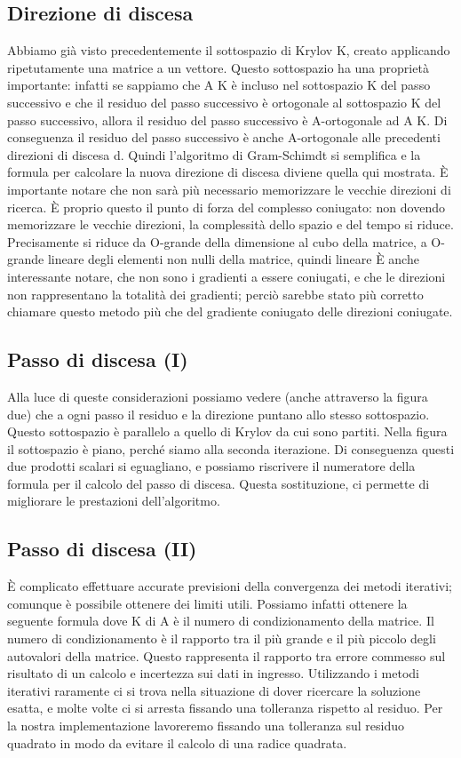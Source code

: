 \documentclass[a4paper]{article}
\begin{document}
\subsection*{Direzione di discesa}
Abbiamo già visto precedentemente il sottospazio di Krylov K, creato applicando ripetutamente una matrice a un vettore.
Questo sottospazio ha una proprietà importante: infatti se sappiamo che A K è incluso nel sottospazio K del passo successivo e che il residuo del passo successivo è ortogonale  al sottospazio K del passo successivo, allora il residuo del passo successivo è A-ortogonale ad A K.
Di conseguenza il residuo del passo successivo è anche A-ortogonale alle precedenti direzioni di discesa d.
Quindi l’algoritmo di Gram-Schimdt si semplifica e la formula per calcolare la nuova direzione di discesa diviene quella qui mostrata.
È importante notare che non sarà più necessario memorizzare le vecchie direzioni di ricerca.
È proprio questo il punto di forza del complesso coniugato: non dovendo memorizzare le vecchie direzioni, la complessità dello spazio e del tempo si riduce.
Precisamente si riduce da O-grande della dimensione al cubo della matrice, a O-grande lineare degli elementi non nulli della matrice, quindi lineare
È anche interessante notare, che non sono i gradienti a essere coniugati, e che le direzioni non rappresentano la totalità dei gradienti; perciò sarebbe stato più corretto chiamare questo metodo più che del gradiente coniugato delle direzioni coniugate.

\subsection*{Passo di discesa (I)}
Alla luce di queste considerazioni possiamo vedere (anche attraverso la figura due) che a ogni passo il residuo e la direzione puntano allo stesso sottospazio.
Questo sottospazio è parallelo a quello di Krylov da cui sono partiti. Nella figura il sottospazio è piano, perché siamo alla seconda iterazione.
Di conseguenza questi due prodotti scalari si eguagliano, e possiamo riscrivere il numeratore della formula per il calcolo del passo di discesa.
Questa sostituzione, ci permette di migliorare le prestazioni dell’algoritmo.

\subsection*{Passo di discesa (II)}

È complicato effettuare accurate previsioni della convergenza dei metodi iterativi; comunque è possibile ottenere dei limiti utili. Possiamo infatti ottenere la seguente formula dove K di A è il numero di condizionamento della matrice.
Il numero di condizionamento è il rapporto tra il più grande  e il più piccolo degli autovalori della matrice. Questo rappresenta il rapporto tra errore commesso sul risultato di un calcolo e incertezza sui dati in ingresso.
Utilizzando i metodi iterativi raramente ci si trova nella situazione di dover ricercare la soluzione esatta, e molte volte ci si arresta fissando una tolleranza rispetto al residuo.
Per la nostra implementazione lavoreremo fissando una tolleranza sul residuo quadrato in modo da evitare il calcolo di una radice quadrata.
\end{document}
